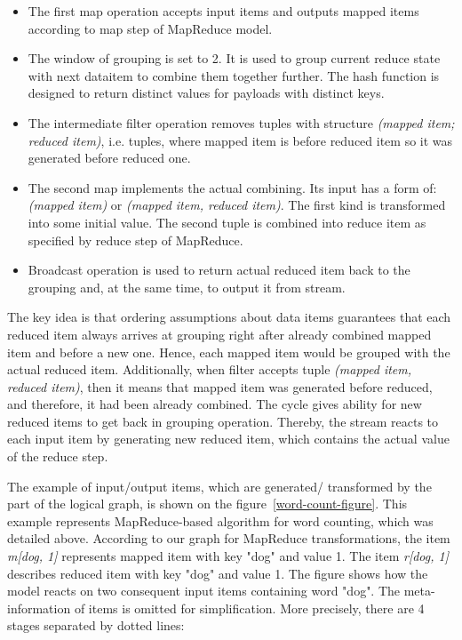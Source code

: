 \begin{itemize}
\item The first map operation accepts input items and outputs mapped items according to map step of MapReduce model.
\item The window of grouping is set to 2. It is used to group current reduce state with next dataitem to combine them together further. The hash function is designed to return distinct values for payloads with distinct keys.
\item The intermediate filter operation removes tuples with structure \textit{(mapped item; reduced item)}, i.e. tuples, where mapped item is before reduced item so it was generated before reduced one.
\item The second map implements the actual combining. Its input has a form of: \textit{(mapped item)} or \textit{(mapped item, reduced item)}. The first kind is transformed into some initial value. The second tuple is combined into reduce item as specified by reduce step of MapReduce. 
\item Broadcast operation is used to return actual reduced item back to the grouping and, at the same time, to output it from stream. 
\end{itemize}

The key idea is that ordering assumptions about data items guarantees that each reduced item always arrives at grouping right after already combined mapped item and before a new one. Hence, each mapped item would be grouped with the actual reduced item. Additionally, when filter accepts tuple {\it (mapped item, reduced item)}, then it means that mapped item was generated before reduced, and therefore, it had been already combined. The cycle gives ability for new reduced items to get back in grouping operation. Thereby, the stream reacts to each input item by generating new reduced item, which contains the actual value of the reduce step.

The example of input/output items, which are generated/ transformed by the part of the logical graph, is shown on the figure~\ref {word-count-figure}. This example represents MapReduce-based algorithm for word counting, which was detailed above. According to our graph for MapReduce transformations, the item {\it m[dog, 1]} represents mapped item with key "dog" and value 1. The item {\it r[dog, 1]} describes reduced item with key "dog" and value 1. The figure shows how the model reacts on two consequent input items containing word "dog". The meta-information of items is omitted for simplification. More precisely, there are 4 stages separated by dotted lines:

